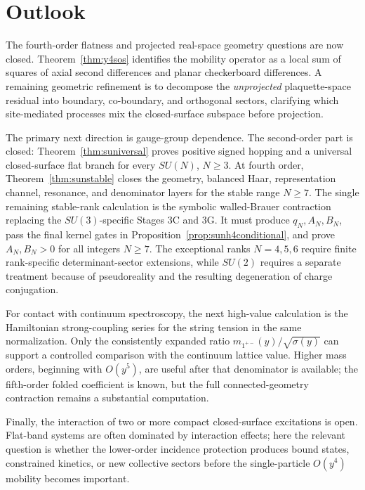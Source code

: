 \documentclass[11pt]{article}
\begin{document}
\section{Outlook}
\label{sec:outlook}

The fourth-order flatness and projected real-space geometry questions are now
closed. Theorem~\ref{thm:y4sos} identifies the mobility operator as a local
sum of squares of axial second differences and planar checkerboard
differences. A remaining geometric refinement is to decompose the
\emph{unprojected} plaquette-space residual into boundary, co-boundary, and
orthogonal sectors, clarifying which site-mediated processes mix the
closed-surface subspace before projection.

The primary next direction is gauge-group dependence. The second-order part is closed:
Theorem~\ref{thm:suniversal} proves positive signed hopping and a universal
closed-surface flat branch for every $SU(N)$, $N\geq3$. At fourth order,
Theorem~\ref{thm:sunstable} closes the geometry, balanced Haar, representation
channel, resonance, and denominator layers for the stable range $N\geq7$.
The single remaining stable-rank calculation is the symbolic walled-Brauer
contraction replacing the $SU(3)$-specific Stages 3C and 3G. It must produce
$q_N,A_N,B_N$, pass the final kernel gates in
Proposition~\ref{prop:sunh4conditional}, and prove $A_N,B_N>0$ for all
integers $N\geq7$. The exceptional ranks $N=4,5,6$ require finite
rank-specific determinant-sector extensions, while $SU(2)$ requires a
separate treatment because of pseudoreality and the resulting degeneration of
charge conjugation.

For contact with continuum spectroscopy, the next high-value calculation is
the Hamiltonian strong-coupling series for the string tension in the same
normalization. Only the consistently expanded ratio
$m_{1^{+-}}(y)/\sqrt{\sigma(y)}$ can support a controlled comparison with
the continuum lattice value. Higher mass orders, beginning with $O(y^5)$,
are useful after that denominator is available; the fifth-order folded
coefficient is known, but the full connected-geometry contraction remains a
substantial computation.

Finally, the interaction of two or more compact closed-surface excitations is
open. Flat-band systems are often dominated by interaction effects; here the
relevant question is whether the lower-order incidence protection produces
bound states, constrained kinetics, or new collective sectors before the
single-particle $O(y^4)$ mobility becomes important.
\end{document}
